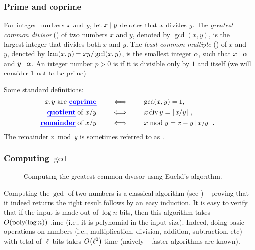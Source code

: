 \subsubsection{Prime and coprime}
For integer numbers $x$ and $y$, let $x \mid y$ denotes that $x$
divides $y$. The \emph{greatest common divisor} () of two
numbers $x$ and $y$, denoted by $\gcd(x,y)$, is the largest integer
that divides both $x$ and $y$. The \emph{least common multiple}
() of $x$ and $y$, denoted by $\mathop{\mathrm{lcm}}(x,y) = xy /
\gcd(x,y)$, is the smallest integer $\alpha$, such that $x \mid
\alpha$ and $y \mid \alpha$. An integer number $p > 0$ is
 if it is divisible only by $1$ and itself (we will
consider $1$ not to be prime).

Some standard definitions:
\begin{align*}
    x,y \text{ are \emphOnly{coprime}}
    \qquad &\iff \qquad \gcd(x,y)=1,\\
    \text{\emphOnly{quotient} of } x/y \qquad
    &\iff \qquad
    x \bdiv y = \floor{x/y},\\
    \text{\emphOnly{remainder} of }x /y \qquad
    &\iff \qquad x \bmod y =
    x - y \floor{x/y}.
\end{align*}
%
The remainder $x \bmod y$ is sometimes referred to as .


\subsubsection{Computing $\gcd$}

\begin{figure}[t]
   \centering
   \caption{Computing the greatest common divisor using Euclid's algorithm.}
\end{figure}


Computing the $\gcd$ of two numbers is a classical algorithm (see
) -- proving that it indeed returns the right result
follows by an easy induction. It is easy to verify that if the input
is made out of $\log n$ bits, then this algorithm takes $O\pth{ \poly(
   \log n )}$ time (i.e., it is polynomial in the input size). Indeed,
doing basic operations on numbers (i.e., multiplication, division,
addition, subtraction, etc) with total of $\ell$ bits takes $O\pth{
   \ell^2 }$ time (naively -- faster algorithms are known).

